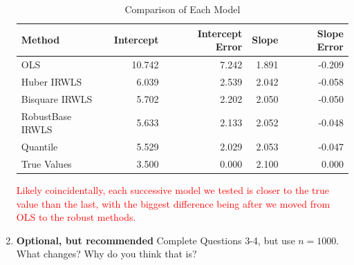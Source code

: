 \documentclass{article}\usepackage[]{graphicx}\usepackage[]{xcolor}
\begin{document}
\begin{enumerate}
\begin{table}[H]
\centering
\begingroup\normalsize
\begin{tabular}{lrrrr}
  \hline
Method & Intercept & Intercept Error & Slope & Slope Error \\ 
  \hline
OLS & 10.742 & 7.242 & 1.891 & -0.209 \\ 
  Huber IRWLS & 6.039 & 2.539 & 2.042 & -0.058 \\ 
  Bisquare IRWLS & 5.702 & 2.202 & 2.050 & -0.050 \\ 
  RobustBase IRWLS & 5.633 & 2.133 & 2.052 & -0.048 \\ 
  Quantile & 5.529 & 2.029 & 2.053 & -0.047 \\ 
  True Values & 3.500 & 0.000 & 2.100 & 0.000 \\ 
   \hline
\end{tabular}
\endgroup
\caption{Comparison of Each Model} 
\label{total.model.sum}
\end{table}


\textcolor{red}{Likely coincidentally, each successive model we tested is closer to the true value than the last, with the biggest difference being after we moved from OLS to the robust methods.}


\item \textbf{Optional, but recommended} Complete Questions 3-4, but use $n=1000$.
What changes? Why do you think that is?

\end{enumerate}

\end{document}
